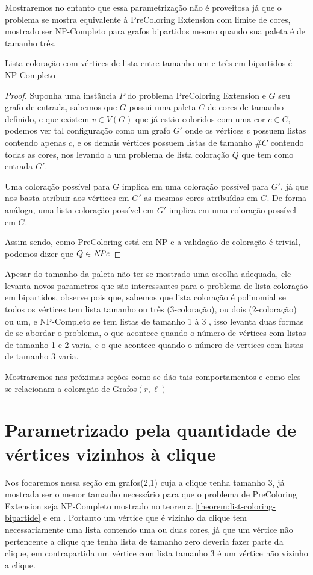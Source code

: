Mostraremos no entanto que essa parametrização não é proveitosa já que o problema se mostra equivalente à PreColoring Extension com limite de cores, mostrado ser NP-Completo para grafos bipartidos mesmo quando sua paleta é de tamanho três\cite{kratochvil94}.

\begin{teorema}
	Lista coloração com vértices de lista entre tamanho um e três em bipartidos é NP-Completo
\end{teorema}
\label{theorem:list-coloring-bipartide}
\begin{proof}
	Suponha uma instância $P$ do problema PreColoring Extension e $G$ seu grafo de entrada, sabemos que $G$ possui uma paleta $C$ de cores de tamanho definido, e que existem $v \in V(G)$ que já estão coloridos com uma cor $c \in C$, podemos ver tal configuração como um grafo $G'$ onde os vértices $v$ possuem listas contendo apenas $c$, e os demais vértices possuem listas de tamanho $\#C$ contendo todas as cores, nos levando a um problema de lista coloração $Q$ que tem como entrada $G'$.
	
	Uma coloração possível para $G$ implica em uma coloração possível para $G'$, já que nos basta atribuir aos vértices em $G'$ as mesmas cores atribuídas em $G$. De forma análoga, uma lista coloração possível em $G'$ implica em uma coloração possível em $G$.
	
	Assim sendo, como PreColoring está em NP e a validação de coloração é trivial, podemos dizer que $Q \in \textit{NPc}$
\end{proof}


Apesar do tamanho da paleta não ter se mostrado uma escolha adequada, ele levanta novos parametros que são interessantes para o problema de lista coloração em bipartidos, observe pois que, sabemos que lista coloração é polinomial se todos os vértices tem lista tamanho ou três (3-coloração), ou dois (2-coloração) ou um, e NP-Completo se tem listas de tamanho 1 à 3 \cite{kratochvil94}, isso levanta duas formas de se abordar o problema, o que acontece quando o número de vértices com listas de tamanho 1 e 2 varia, e o que acontece quando o número de vertices com listas de tamanho 3 varia.

Mostraremos nas próximas seções como se dão tais comportamentos e como eles se relacionam a coloração de Grafos$(r,\ell)$

\section{Parametrizado pela quantidade de vértices vizinhos à clique}
Nos focaremos nessa seção em grafos(2,1) cuja a clique tenha tamanho 3, já mostrada ser o menor tamanho necessário para que o problema de PreColoring Extension seja NP-Completo mostrado no teorema \ref{theorem:list-coloring-bipartide} e em \cite{kratochvil94,hujter93}. Portanto um vértice que é vizinho da clique tem necessariamente uma lista contendo uma ou duas cores, já que um vértice não pertencente a clique que tenha lista de tamanho zero deveria fazer parte da clique, em contrapartida um vértice com lista tamanho 3 é um vértice não vizinho a clique. 

